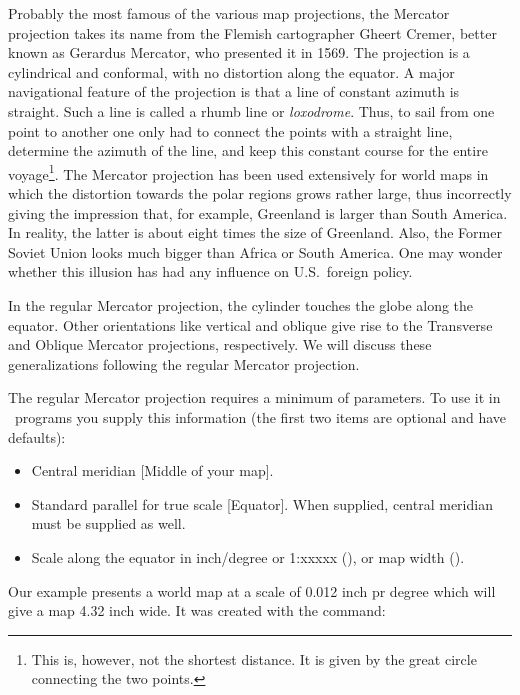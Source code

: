 Probably the most famous of the various map projections,
the Mercator projection takes its name from the Flemish cartographer Gheert Cremer, better known as Gerardus Mercator, who presented it in 1569.  
The projection is a cylindrical and conformal, with no distortion along the equator.  A major
navigational feature of the projection is that a line of
constant azimuth is straight.  Such a line is called a
rhumb line or \emph{loxodrome}.  Thus, to sail from one
point to another one only had to connect the points with
a straight line, determine the azimuth of the line, and
keep this constant course for the entire voyage\footnote{This
is, however, not the shortest distance.  It is given
by the great circle connecting the two points.}.  The
Mercator projection has been used extensively for world
maps in which the distortion towards the polar regions
grows rather large, thus incorrectly giving the impression
that, for example, Greenland is larger than South America.
In reality, the latter is about eight times the size of
Greenland.  Also, the Former Soviet Union looks much bigger
than Africa or South America.  One may wonder whether this
illusion has had any influence on U.S.\ foreign policy.

In the regular Mercator projection, the cylinder touches
the globe along the equator.  Other orientations like
vertical and oblique give rise to the Transverse and
Oblique Mercator projections, respectively.  We will
discuss these generalizations following the regular
Mercator projection.

The regular Mercator projection requires a minimum of
parameters.  To use it in \GMT\ programs you supply this
information (the first two items are optional and have defaults):

\begin{itemize} 
\item Central meridian [Middle of your map].
\item Standard parallel for true scale [Equator]. When supplied, central meridian must be supplied as well.
\item Scale along the equator in inch/degree or
1:xxxxx (), or map width ().
\end{itemize} 

Our example presents a world map at a scale of 0.012
inch pr degree which will give a map 4.32 inch wide.
It was created with the command:



